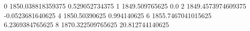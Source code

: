 0 1850.038818359375 0.529052734375
1 1849.509765625 0.0
2 1849.4573974609375 -0.0523681640625
4 1850.50390625 0.994140625
6 1855.7467041015625 6.2369384765625
8 1870.322509765625 20.812744140625
